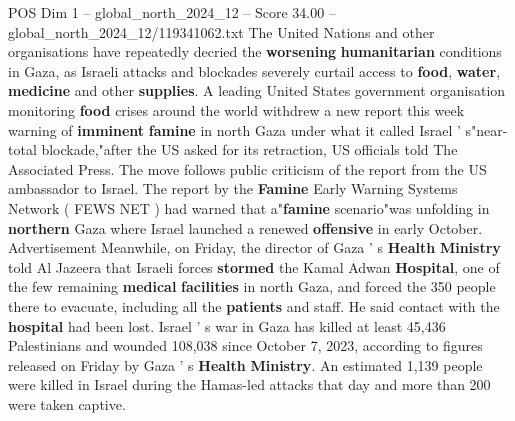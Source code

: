 \begin{textsample}{POS Dim 1 – global\_north\_2024\_12 – Score 34.00 – global\_north\_2024\_12/119341062.txt}
The United Nations and other organisations have repeatedly decried the \textbf{worsening} \textbf{humanitarian} conditions in Gaza, as Israeli attacks and blockades severely curtail access to \textbf{food}, \textbf{water}, \textbf{medicine} and other \textbf{supplies}.
A leading United States government organisation monitoring \textbf{food} crises around the world withdrew a new report this week warning of \textbf{imminent} \textbf{famine} in north Gaza under what it called Israel ' s"near-total blockade,"after the US asked for its retraction, US officials told The Associated Press.
The move follows public criticism of the report from the US ambassador to Israel.
The report by the \textbf{Famine} Early Warning Systems Network ( FEWS NET ) had warned that a"\textbf{famine} scenario"was unfolding in \textbf{northern} Gaza where Israel launched a renewed \textbf{offensive} in early October.
Advertisement Meanwhile, on Friday, the director of Gaza ' s \textbf{Health} \textbf{Ministry} told Al Jazeera that Israeli forces \textbf{stormed} the Kamal Adwan \textbf{Hospital}, one of the few remaining \textbf{medical} \textbf{facilities} in north Gaza, and forced the 350 people there to evacuate, including all the \textbf{patients} and staff.
He said contact with the \textbf{hospital} had been lost.
Israel ' s war in Gaza has killed at least 45,436 Palestinians and wounded 108,038 since October 7, 2023, according to figures released on Friday by Gaza ' s \textbf{Health} \textbf{Ministry}.
An estimated 1,139 people were killed in Israel during the Hamas-led attacks that day and more than 200 were taken captive.

\end{textsample}
